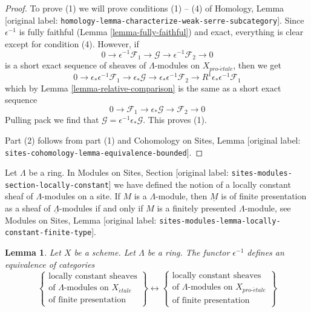 \documentclass[10pt,a4paper]{article}
\theoremstyle{plain}
\newtheorem{lemma}[subsection]{Lemma}
\theoremstyle{definition}
\theoremstyle{remark}
\numberwithin{equation}{subsection}
\def\proetale{{pro\text{-}\acute{e}tale}}
\def\etale{{\acute{e}tale}}
\begin{document}
\begin{proof}
To prove (1) we will prove conditions (1) -- (4) of
Homology, Lemma [original label: \nolinkurl{homology-lemma-characterize-weak-serre-subcategory}].
Since $\epsilon^{-1}$ is fully faithful (Lemma \ref{lemma-fully-faithful})
and exact, everything is clear except for condition (4).
However, if
$$
0 \to \epsilon^{-1}\mathcal{F}_1 \to \mathcal{G} \to
\epsilon^{-1}\mathcal{F}_2 \to 0
$$
is a short exact sequence of sheaves of $\Lambda$-modules on $X_\proetale$,
then we get
$$
0 \to \epsilon_*\epsilon^{-1}\mathcal{F}_1 \to \epsilon_*\mathcal{G} \to
\epsilon_*\epsilon^{-1}\mathcal{F}_2 \to
R^1\epsilon_*\epsilon^{-1}\mathcal{F}_1
$$
which by Lemma \ref{lemma-relative-comparison}
is the same as a short exact sequence
$$
0 \to \mathcal{F}_1 \to \epsilon_*\mathcal{G} \to \mathcal{F}_2 \to 0
$$
Pulling pack we find that $\mathcal{G} = \epsilon^{-1}\epsilon_*\mathcal{G}$.
This proves (1).

\medskip\noindent
Part (2) follows from part (1) and Cohomology on Sites,
Lemma [original label: \nolinkurl{sites-cohomology-lemma-equivalence-bounded}].
\end{proof}

\noindent
Let $\Lambda$ be a ring. In
Modules on Sites, Section [original label: \nolinkurl{sites-modules-section-locally-constant}]
we have defined the notion of a locally constant sheaf of $\Lambda$-modules
on a site. If $M$ is a $\Lambda$-module, then $\underline{M}$ is of finite
presentation as a sheaf of $\underline{\Lambda}$-modules if and only
if $M$ is a finitely presented $\Lambda$-module, see
Modules on Sites, Lemma [original label: \nolinkurl{sites-modules-lemma-locally-constant-finite-type}].

\begin{lemma}
\label{lemma-compare-locally-constant}
Let $X$ be a scheme. Let $\Lambda$ be a ring.
The functor $\epsilon^{-1}$ defines an equivalence of categories
$$
\left\{
\begin{matrix}
\text{locally constant sheaves}\\
\text{of }\Lambda\text{-modules on }X_\etale\\
\text{of finite presentation}
\end{matrix}
\right\}
\longleftrightarrow
\left\{
\begin{matrix}
\text{locally constant sheaves}\\
\text{of }\Lambda\text{-modules on }X_\proetale\\
\text{of finite presentation}
\end{matrix}
\right\}
$$
\end{lemma}
\end{document}
